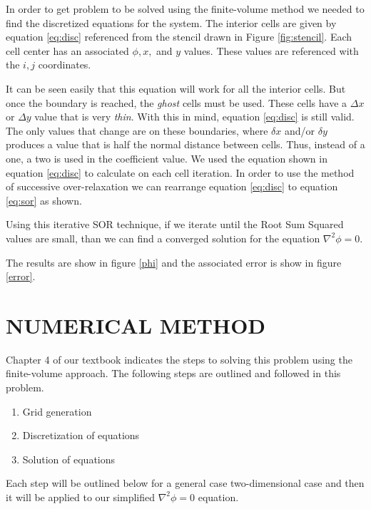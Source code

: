\documentclass[cleanfoot,cleanhead,twocolumn,10pt,notitlepage]{asme2e}
\begin{document}
In order to get problem to be solved using the finite-volume method we needed to find the discretized equations for the system.  The interior cells are given by equation \ref{eq:disc} referenced from the stencil drawn in Figure \ref{fig:stencil}.  Each cell center has an associated $\phi,x,$ and $y$ values.  These values are referenced with the $i,j$ coordinates.  

It can be seen easily that this equation will work for all the interior cells.  But once the boundary is reached, the \textit{ghost} cells must be used.  These cells have a $\Delta x$ or $\Delta y$ value that is very \textit{thin}.  With this in mind, equation \ref{eq:disc} is still valid.  The only values that change are on these boundaries, where $\delta x$ and/or $\delta y$ produces a value that is half the normal distance between cells.  Thus, instead of a one, a two is used in the coefficient value.  We used the equation shown in equation \ref{eq:disc} to calculate on each cell iteration.  In order to use the method of successive over-relaxation we can rearrange equation \ref{eq:disc} to equation \ref{eq:sor} as shown.

Using this iterative SOR technique, if we iterate until the Root Sum Squared values are small, than we can find a converged solution for the equation $\nabla^2 \phi = 0$.  

The results are show in figure \ref{phi} and the associated error is show in figure \ref{error}.  


\section*{NUMERICAL METHOD}

Chapter 4 of our textbook \cite{CFD_book} indicates the steps to solving this problem using the finite-volume approach.  The following steps are outlined and followed in this problem.

\begin{enumerate}
\item Grid generation
\item Discretization of equations
\item Solution of equations
\end{enumerate}

Each step will be outlined below for a general case two-dimensional case and then it will be applied to our simplified $\nabla^2 \phi = 0$ equation.
\end{document}
